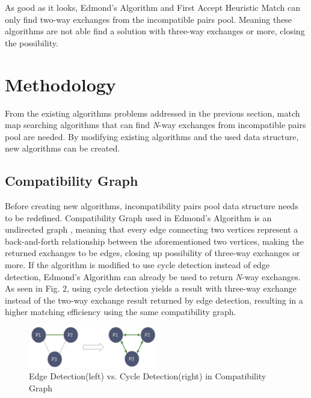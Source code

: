 \documentclass[conference]{IEEEtran}
\begin{document}
As good as it looks, Edmond's Algorithm and First Accept Heuristic Match can only find two-way exchanges from the
incompatible pairs pool. Meaning these algorithms are not able find a solution with three-way exchanges or more,
closing the possibility.

\section{Methodology}
From the existing algorithms problems addressed in the previous section, match map searching algorithms that can find
\textit{N}-way exchanges from incompatible pairs pool are needed. By modifying existing algorithms and the used data
structure, new algorithms can be created.

\subsection{Compatibility Graph}
Before creating new algorithms, incompatibility pairs pool data structure needs to be redefined. Compatibility Graph
used in Edmond's Algorithm is an undirected graph \cite{raja}, meaning that every edge connecting two vertices represent a back-and-forth
relationship between the aforementioned two vertices, making the returned exchanges to be edges, closing up possibility
of three-way exchanges or more. If the algorithm is modified to use cycle detection instead of edge detection, Edmond's
Algorithm can already be used to return \textit{N}-way exchanges.
As seen in Fig. 2, using cycle detection yields a result with three-way exchange instead of the two-way exchange result
returned by edge detection, resulting in a higher matching efficiency using the same compatibility graph. 

\begin{figure}
    \includegraphics[width=0.5\textwidth]{images/edge-vs-cycle-detection.jpg}
    \caption{Edge Detection(left) vs. Cycle Detection(right) in Compatibility Graph}
\end{figure}
\end{document}
